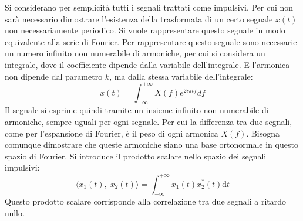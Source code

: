 \documentclass{article}
\newcommand{\df}{\mathrm{d}}
\numberwithin{equation}{subsection}
\begin{document}
Si considerano per semplicità tutti i segnali trattati come impulsivi. Per cui non sarà necessario dimostrare l'esistenza della trasformata di un certo segnale $x(t)$ 
non necessariamente periodico. Si vuole rappresentare questo segnale in modo equivalente alla serie di Fourier. Per rappresentare questo segnale sono necessarie un numero 
infinito non numerabile di armoniche, per cui si considera un integrale, dove il coefficiente dipende dalla variabile dell'integrale. E l'armonica non dipende dal parametro 
$k$, ma dalla stessa variabile dell'integrale:
\begin{equation*}
    x(t)=\displaystyle\int_{-\infty}^{+\infty}X(f)e^{2i\pi tf}df
\end{equation*}
Il segnale si esprime quindi tramite un insieme infinito non numerabile di armoniche, sempre uguali per ogni segnale. Per cui la differenza tra due segnali, come per 
l'espansione di Fourier, è il peso di ogni armonica $X(f)$. Bisogna comunque dimostrare che queste armoniche siano una base ortonormale in questo spazio di Fourier. Si 
introduce il prodotto scalare nello spazio dei segnali impulsivi:
\begin{equation*}
    \langle x_1(t),\;x_2(t)\rangle=\displaystyle\int_{-\infty}^{+\infty}x_1(t)x_2^*(t)\df t
\end{equation*}
Questo prodotto scalare corrisponde alla correlazione tra due segnali a ritardo nullo. 
\end{document}
